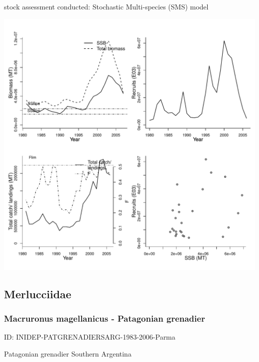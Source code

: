 stock assessment conducted: Stochastic Multi-species (SMS) model 
\begin{center}
\vspace{-0.2cm}\includegraphics[scale=0.65]{../tex/figures/plot-WGNPBW-BWHITNEA-1980-2007-JENNINGS.pdf}
\end{center}

\newpage
\subsection{Merlucciidae}

\subsubsection{Macruronus magellanicus - Patagonian grenadier}
ID: INIDEP-PATGRENADIERSARG-1983-2006-Parma

Patagonian grenadier Southern Argentina 


